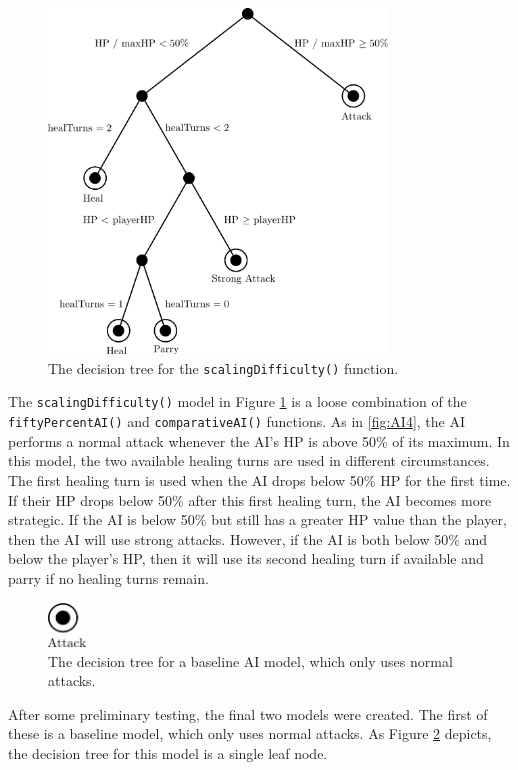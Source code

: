 \begin{figure}[H]
  \centering
  \includegraphics[width=9cm]{figures/AIScaling.png}
  \caption{The decision tree for the \texttt{scalingDifficulty()} function.}
  \label{fig:AI6}
\end{figure}

The \texttt{scalingDifficulty()} model in Figure \ref{fig:AI6} is a loose combination of the \texttt{fiftyPercentAI()} and \texttt{comparativeAI()} functions. As in \ref{fig:AI4}, the AI performs a normal attack whenever the AI's HP is above 50\% of its maximum. In this model, the two available healing turns are used in different circumstances. The first healing turn is used when the AI drops below 50\% HP for the first time. If their HP drops below 50\% after this first healing turn, the AI becomes more strategic. If the AI is below 50\% but still has a greater HP value than the player, then the AI will use strong attacks. However, if the AI is both below 50\% and below the player's HP, then it will use its second healing turn if available and parry if no healing turns remain.\\

\begin{figure}[H]
  \centering
  \includegraphics[width=1cm]{figures/AIAttack.png}
  \caption{The decision tree for a baseline AI model, which only uses normal attacks.}
  \label{fig:AI7}
  \end{figure}

After some preliminary testing, the final two models were created. The first of these is a baseline model, which only uses normal attacks. As Figure \ref{fig:AI7} depicts, the decision tree for this model is a single leaf node.

